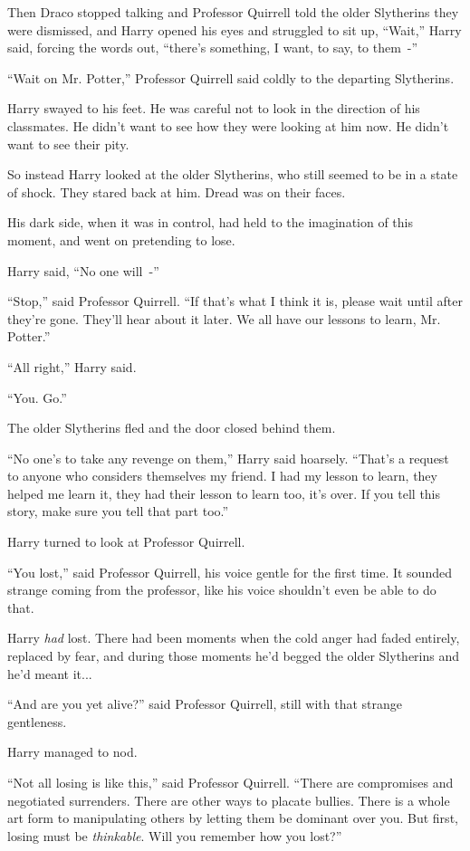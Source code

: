 Then Draco stopped talking and Professor Quirrell told the older Slytherins they were dismissed, and Harry opened his eyes and struggled to sit up, ``Wait,'' Harry said, forcing the words out, ``there's something, I want, to say, to them~-''

``Wait on Mr. Potter,'' Professor Quirrell said coldly to the departing Slytherins.

Harry swayed to his feet. He was careful not to look in the direction of his classmates. He didn't want to see how they were looking at him now. He didn't want to see their pity.

So instead Harry looked at the older Slytherins, who still seemed to be in a state of shock. They stared back at him. Dread was on their faces.

His dark side, when it was in control, had held to the imagination of this moment, and went on pretending to lose.

Harry said, ``No one will~-''

``Stop,'' said Professor Quirrell. ``If that's what I think it is, please wait until after they're gone. They'll hear about it later. We all have our lessons to learn, Mr. Potter.''

``All right,'' Harry said.

``You. Go.''

The older Slytherins fled and the door closed behind them.

``No one's to take any revenge on them,'' Harry said hoarsely. ``That's a request to anyone who considers themselves my friend. I had my lesson to learn, they helped me learn it, they had their lesson to learn too, it's over. If you tell this story, make sure you tell that part too.''

Harry turned to look at Professor Quirrell.

``You lost,'' said Professor Quirrell, his voice gentle for the first time. It sounded strange coming from the professor, like his voice shouldn't even be able to do that.

Harry \emph{had} lost. There had been moments when the cold anger had faded entirely, replaced by fear, and during those moments he'd begged the older Slytherins and he'd meant it...

``And are you yet alive?'' said Professor Quirrell, still with that strange gentleness.

Harry managed to nod.

``Not all losing is like this,'' said Professor Quirrell. ``There are compromises and negotiated surrenders. There are other ways to placate bullies. There is a whole art form to manipulating others by letting them be dominant over you. But first, losing must be \emph{thinkable}. Will you remember how you lost?''

